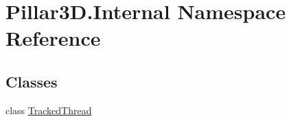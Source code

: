 \hypertarget{namespace_pillar3_d_1_1_internal}{}\section{Pillar3\+D.\+Internal Namespace Reference}
\label{namespace_pillar3_d_1_1_internal}
\subsection*{Classes}
\begin{DoxyCompactItemize}
\item 
class \hyperlink{class_pillar3_d_1_1_internal_1_1_tracked_thread}{Tracked\+Thread}
\end{DoxyCompactItemize}
